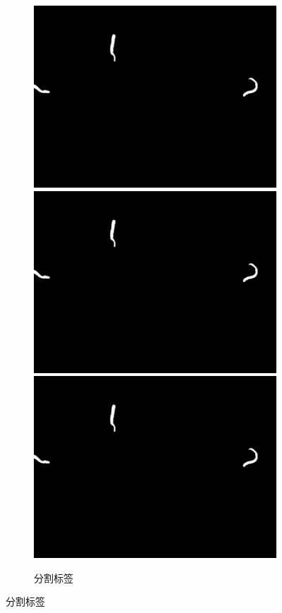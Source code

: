 \begin{figure}[!htp]
	 \begin{subfigure}{\linewidth}
		\centering
		\begin{minipage}[b]{\linewidth}
		\includegraphics[width=0.33\linewidth,natwidth=800,natheight=600]{figure/chap3/label/441.orgin.1051.jpg}
		\includegraphics[width=0.33\linewidth,natwidth=800,natheight=600]{figure/chap3/label/441.orgin.1051.jpg}
		\includegraphics[width=0.33\linewidth,natwidth=800,natheight=600]{figure/chap3/label/441.orgin.1051.jpg}
		\end{minipage}
		\caption{分割标签}
	  \end{subfigure}


\end{figure}
